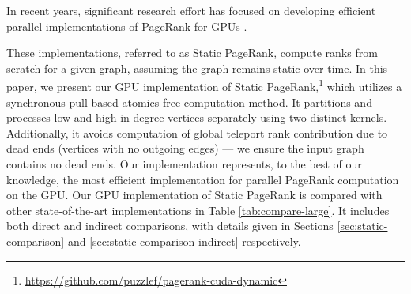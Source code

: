 In recent years, significant research effort has focused on developing efficient parallel implementations of PageRank for GPUs \cite{duong2012parallel, rank-nvgraph, wang2016gunrock, busato2018hornet, dathathri2018gluon, nodehi2018tigr, grutzmacher2018high, piccinotti2019solving, grutzmacher2020acceleration, kang2020computing, wang2021grus, chen2022atos, chen2022scalable, yang2022graphblast, concessao2023meerkat}. These implementations, referred to as Static PageRank, compute ranks from scratch for a given graph, assuming the graph remains static over time. In this paper, we present our GPU implementation of Static PageRank,\footnote{\label{foo:repository}\url{https://github.com/puzzlef/pagerank-cuda-dynamic}} which utilizes a synchronous pull-based atomics-free computation method. It partitions and processes low and high in-degree vertices separately using two distinct kernels. Additionally, it avoids computation of global teleport rank contribution due to dead ends (vertices with no outgoing edges) --- we ensure the input graph contains no dead ends. Our implementation represents, to the best of our knowledge, the most efficient implementation for parallel PageRank computation on the GPU. Our GPU implementation of Static PageRank is compared with other state-of-the-art implementations in Table \ref{tab:compare-large}. It includes both direct and indirect comparisons, with details given in Sections \ref{sec:static-comparison} and \ref{sec:static-comparison-indirect} respectively.



